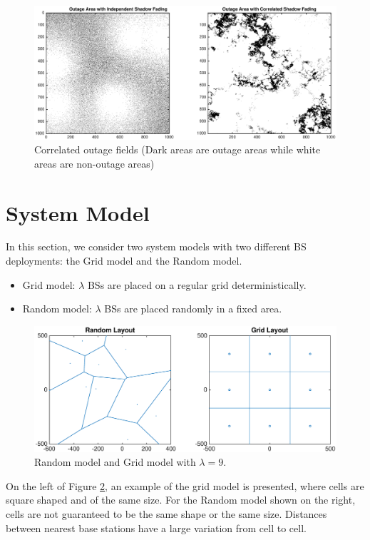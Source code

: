  \begin{figure}
 \centering
 \includegraphics[width=14cm]{outageArea.eps}
 \caption{Correlated outage fields (Dark areas are outage areas while white areas are non-outage areas)}
 \label{4:outagefie}
 \end{figure}


 \section{System Model}
 \label{4:SystemModel}
 In this section, we consider two system models with two different BS deployments: the Grid model and the Random model.
 \begin{itemize}
 \item Grid model: $\lambda$ BSs are placed on a regular grid deterministically.
 \item Random model: $\lambda$ BSs are placed randomly in a fixed area.
 \end{itemize}
 \begin{figure}
 \centering
 \includegraphics[width=14cm]{systemLayout.eps}
 \caption{Random model and Grid model with $\lambda = 9$.}
 \label{4:RandomLayout}
 \end{figure}
On the left of Figure \ref{4:RandomLayout}, an example of the grid model is presented, where cells are square shaped and of the same size. For the Random model shown on the right, cells are not guaranteed to be the same shape or the same size. Distances between nearest base stations have a large variation from cell to cell.


